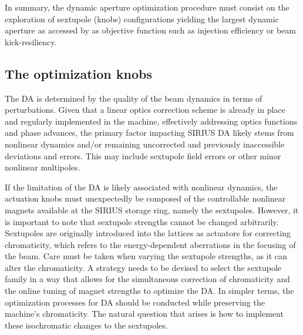 
In summary, the dynamic aperture optimization procedure must consist on the exploration of sextupole (knobs) configurations yielding the largest dynamic aperture as accessed by as objective function such as injection efficiency or beam kick-resiliency.

\subsection{The optimization knobs}
\label{subsec:knobs}
The DA is determined by the quality of the beam dynamics in terms of perturbations. Given that a linear optics correction scheme is already in place and regularly implemented in the machine, effectively addressing optics functions and phase advances, the primary factor impacting SIRIUS DA likely stems from nonlinear dynamics and/or remaining uncorrected and previously inaccessible deviations and errors. This may include sextupole field errors or other minor nonlinear multipoles.

If the limitation of the DA is likely associated with nonlinear dynamics, the actuation knobs must unexpectedly be composed of the controllable nonlinear magnets available at the SIRIUS storage ring, namely the sextupoles. However, it is important to note that sextupole strengths cannot be changed arbitrarily. Sextupoles are originally introduced into the lattices as actuators for correcting chromaticity, which refers to the energy-dependent aberrations in the focusing of the beam. Care must be taken when varying the sextupole strengths, as it can alter the chromaticity. A strategy needs to be devised to select the sextupole family in a way that allows for the simultaneous correction of chromaticity and the online tuning of magnet strengths to optimize the DA. In simpler terms, the optimization processes for DA should be conducted while preserving the machine's chromaticity. The natural question that arises is how to implement these isochromatic changes to the sextupoles.

